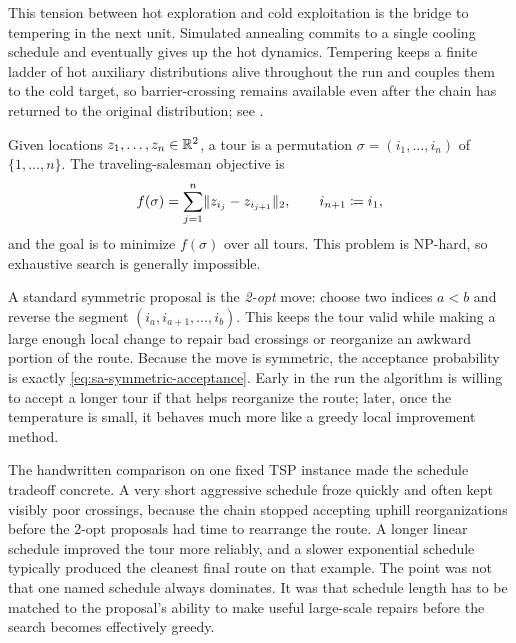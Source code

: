 This tension between hot exploration and cold exploitation is the bridge to tempering in the next unit.
Simulated annealing commits to a single cooling schedule and eventually gives up the hot dynamics.
Tempering keeps a finite ladder of hot auxiliary distributions alive throughout the run and couples them to the cold target, so barrier-crossing remains available even after the chain has returned to the original distribution; see .

\begin{example}
\label{ex:sa-tsp}
Given locations $z_1,\dots,z_n\in\mathbb{R}^2$, a tour is a permutation $\sigma=(i_1,\dots,i_n)$ of $\{1,\dots,n\}$.
The traveling-salesman objective is
\[
  f(\sigma)
  =
  \sum_{j=1}^{n} \lVert z_{i_j}-z_{i_{j+1}}\rVert_2,
  \qquad i_{n+1}\coloneqq i_1,
\]
and the goal is to minimize $f(\sigma)$ over all tours.
This problem is NP-hard, so exhaustive search is generally impossible.

A standard symmetric proposal is the \emph{2-opt} move:
choose two indices $a<b$ and reverse the segment $(i_a,i_{a+1},\dots,i_b)$.
This keeps the tour valid while making a large enough local change to repair bad crossings or reorganize an awkward portion of the route.
Because the move is symmetric, the acceptance probability is exactly \eqref{eq:sa-symmetric-acceptance}.
Early in the run the algorithm is willing to accept a longer tour if that helps reorganize the route; later, once the temperature is small, it behaves much more like a greedy local improvement method.

The handwritten comparison on one fixed TSP instance made the schedule tradeoff concrete.
A very short aggressive schedule froze quickly and often kept visibly poor crossings, because the chain stopped accepting uphill reorganizations before the 2-opt proposals had time to rearrange the route.
A longer linear schedule improved the tour more reliably, and a slower exponential schedule typically produced the cleanest final route on that example.
The point was not that one named schedule always dominates.
It was that schedule length has to be matched to the proposal's ability to make useful large-scale repairs before the search becomes effectively greedy.
\end{example}
